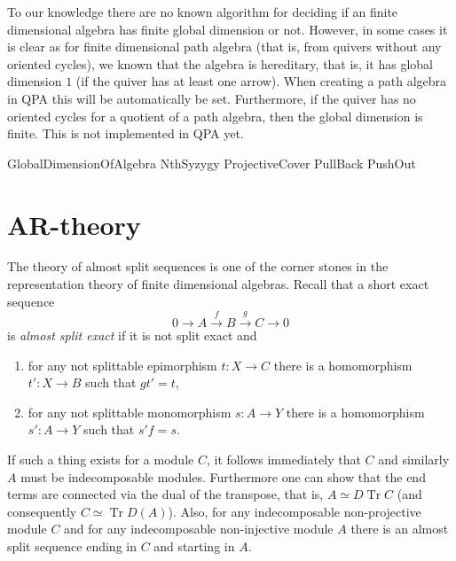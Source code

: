 \documentclass{amsart}
\newcommand{\Tr}{\operatorname{Tr}\nolimits}
\theoremstyle{definition}
\theoremstyle{theoretic}
\begin{document}
To our knowledge there are no known algorithm for deciding if an
finite dimensional algebra has finite global dimension or not.
However, in some cases it is clear as for finite dimensional path
algebra (that is, from quivers without any oriented cycles), we known
that the algebra is hereditary, that is, it has global dimension $1$
(if the quiver has at least one arrow).  When creating a path algebra
in QPA this will be automatically be set.  Furthermore, if the quiver
has no oriented cycles for a quotient of a path algebra, then the
global dimension is finite.  This is not implemented in QPA yet.  

GlobalDimensionOfAlgebra
NthSyzygy
ProjectiveCover
PullBack
PushOut

\section{AR-theory}
The theory of almost split sequences is one of the corner stones in
the representation theory of finite dimensional algebras.  Recall that
a short exact sequence 
\[0\to A\xrightarrow{f} B\xrightarrow{g} C\to 0\]
is \emph{almost split exact} if it is not split exact and 
\begin{enumerate}[\rm(i)]
\item for any not splittable epimorphism $t\colon X\to C$ there is a
  homomorphism $t'\colon X\to B$ such that $gt' = t$, 
\item for any not splittable monomorphism $s\colon A\to Y$ there is a
  homomorphism $s'\colon A\to Y$ such that $s'f = s$.
\end{enumerate}
If such a thing exists for a module $C$, it follows immediately that
$C$ and similarly $A$ must be indecomposable modules.  Furthermore one
can show that the end terms are connected via the dual of the
transpose, that is, $A\simeq D\Tr C$ (and consequently $C\simeq \Tr
D(A)$).  Also, for any indecomposable non-projective module $C$ and
for any indecomposable non-injective module $A$ there is an almost
split sequence ending in $C$ and starting in $A$.  
\end{document}

